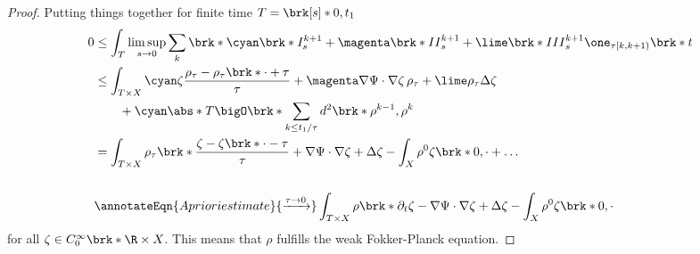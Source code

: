 \begin{frame}
  \begin{proof}
    Putting things together for finite time $T=\brk[s]*{0,t_1}$ %
    \begin{align*}
      0&\leq\int_T\limsup_{s\to0}\sum_k\brk*{{\cyan\brk*{I}^{k+1}_s}+{\magenta\brk*{II}^{k+1}_s}+{\lime\brk*{III}^{k+1}_s}}\one_{\tau[k,k+1)}\brk*{t} \\
      &\leq \int_{T\times X}{\cyan\zeta\frac{\rho_\tau-\rho_\tau\brk*{\cdot+\tau}}{\tau}}
      +{\magenta\nabla\Psi\cdot\nabla\zeta\,\rho_\tau}
      + {\lime\rho_\tau\Delta\zeta} \\
      &\qquad+{\cyan\abs*{T}\bigO\brk*{\sum_{k\leq t_1/\tau}d^2\brk*{\rho^{k-1},\rho^k}}} \\
      &=\int_{T\times X}\rho_\tau\brk*{\frac{\zeta-\zeta\brk*{\cdot-\tau}}{\tau}+\nabla\Psi\cdot\nabla\zeta+\Delta\zeta}
      -\int_{X}\rho^0\zeta\brk*{0,\cdot} +\dots\\ \\
      &\annotateEqn{A priori estimate}{\xrightarrow{\tau\to0}}
      \int_{T\times X}\rho\brk*{\partial_t\zeta-\nabla\Psi\cdot\nabla\zeta+\Delta\zeta}-\int_{X}\rho^0\zeta\brk*{0,\cdot}
    \end{align*}
    for all $\zeta\in C_0^\infty\brk*{\R\times X}$.
    This means that $\rho$ fulfills the weak Fokker-Planck equation.
  \end{proof}
\end{frame}


